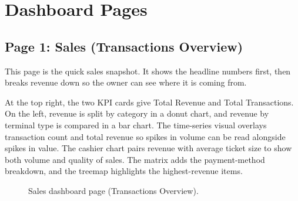 \documentclass[12pt, a4paper]{report}
\begin{document}
\section{Dashboard Pages}

\subsection{Page 1: Sales (Transactions Overview)}

This page is the quick sales snapshot. It shows the headline numbers first, then
breaks revenue down so the owner can see where it is coming from.

At the top right, the two KPI cards give Total Revenue and Total Transactions.
On the left, revenue is split by category in a donut chart, and revenue by terminal
type is compared in a bar chart. The time-series visual overlays transaction count
and total revenue so spikes in volume can be read alongside spikes in value. The
cashier chart pairs revenue with average ticket size to show both volume and
quality of sales. The matrix adds the payment-method breakdown, and the treemap
highlights the highest-revenue items.

\begin{figure}[H]
  \centering
  \caption{Sales dashboard page (Transactions Overview).\label{fig:dash_sales}}
\end{figure}
\end{document}
